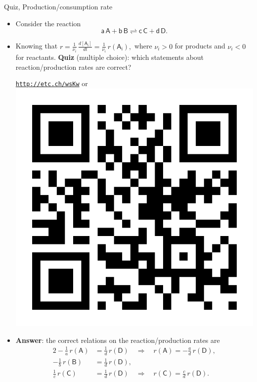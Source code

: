 \begin{frame}{Quiz, Production/consumption rate}
	
	\begin{itemize}
		\item Consider the reaction 
		$$\mathsf{a\, A + b\, B \rightleftharpoons c \, C + d \, D}.$$
		\item Knowing that $r = \tfrac{1}{\nu_i}  \, \tfrac{d [ \mathsf{A_i}]}{dt} = \tfrac{1}{\nu_i} \, r(\mathsf{A_i}),$ where $\nu_i > 0$ for products and $\nu_i < 0$ for reactants. 
		\pause
		\alert{\bf Quiz} (multiple choice): which statements about reaction/production rates are correct?
		\vskip 5pt
		\begin{center}
    	\href{http://etc.ch/wsKw}{\textcolor{indigo(dye)}{\tt http://etc.ch/wsKw}} \quad
			or 
		    \quad	\includegraphics[height=0.12\columnwidth]{figures/chemical-kinetics/polls.png}
		\end{center}
		\hiddenpause 
		\vskip 10pt
		\item \alert{\bf Answer}: the correct relations on the reaction/production rates are
		\begin{alignat*}{2}
		- \tfrac{1}{a} \, r(\mathsf{A}) & = \tfrac{1}{d}\,  r(\mathsf{D}) \quad \Rightarrow \quad r(\mathsf{A}) = - \tfrac{a}{d} \,  r(\mathsf{D}), \\[-3pt]
		- \tfrac{1}{b} \, r(\mathsf{B}) &  = \tfrac{1}{d} \,  r(\mathsf{D}), \\[-3pt]
		\tfrac{1}{c} \,  r(\mathsf{C})  & = \tfrac{1}{d} \,  r(\mathsf{D}) \quad \Rightarrow \quad r(\mathsf{C}) = \tfrac{c}{d} \,  r(\mathsf{D}).
		\end{alignat*}	
	\end{itemize}
\end{frame}
%
%
